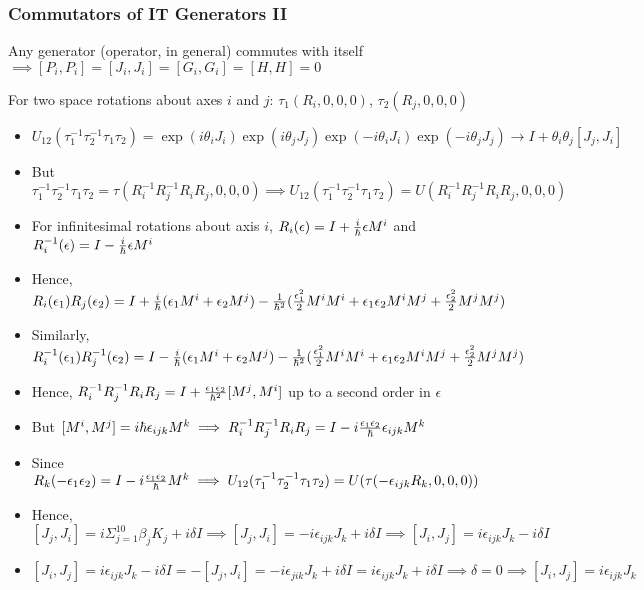 \documentclass[8pt,t,mathserif,aspectratio=169]{beamer}
\begin{document}
\begin{frame}
  \frametitle{Commutators of IT Generators II}
  \vspace{1mm}
  Any generator (operator, in general) commutes with itself $\implies [P_i,P_i] = [J_i,J_i] = [G_i,G_i] = [H,H] = 0$

  For two space rotations about axes $i$ and $j$: $\tau_1(R_i,0,0,0)$, $\tau_2(R_j,0,0,0)$
  \begin{itemize}
    \item $U_{12}(\tau^{-1}_1 \tau^{-1}_2 \tau_1 \tau_2) = \exp(i \theta_i J_i) \exp(i \theta_j J_j) \exp(-i \theta_i J_i) \exp(-i \theta_j J_j) \to I + \theta_i \theta_j [J_j,J_i]$
    \item But $\tau^{-1}_1 \tau^{-1}_2 \tau_1 \tau_2 = \tau(R^{-1}_i R^{-1}_j R_i R_j,0,0,0) \implies U_{12}(\tau^{-1}_1 \tau^{-1}_2 \tau_1 \tau_2) = U(R^{-1}_i R^{-1}_j R_i R_j,0,0,0)$
    \item For infinitesimal rotations about axis $i$, $R_i(\epsilon) = I + {i \over \hbar} \epsilon M^i$ and $R^{-1}_{i}(\epsilon) = I - {i \over \hbar} \epsilon M^i$
    \item Hence, $R_i(\epsilon_1) R_j(\epsilon_2) = I + {i \over \hbar} (\epsilon_1 M^{i} + \epsilon_2 M^{j}) - {1 \over \hbar^2}({\epsilon^2_1 \over 2} M^i M^i + \epsilon_1 \epsilon_2 M^i M^j + {\epsilon^2_2 \over 2} M^j M^j)$
    \item Similarly, $R^{-1}_{i}(\epsilon_1) R^{-1}_{j}(\epsilon_2) = I - {i \over \hbar} (\epsilon_1 M^{i} + \epsilon_2 M^{j}) - {1 \over \hbar^2}({\epsilon^2_1 \over 2} M^i M^i + \epsilon_1 \epsilon_2 M^i M^j + {\epsilon^2_2 \over 2} M^j M^j)$
    \item Hence, $R^{-1}_{i} R^{-1}_{j} R_i R_j = I + {\epsilon_1 \epsilon_2 \over \hbar^2} [M^j,M^i]$ up to a second order in $\epsilon$
    \item But $[M^i,M^j] = i \hbar \epsilon_{ijk} M^k \implies R^{-1}_{i} R^{-1}_{j} R_i R_j = I - i {\epsilon_1 \epsilon_2 \over \hbar} \epsilon_{ijk} M^k$
    \item Since $R_{k}(-\epsilon_1 \epsilon_2) = I - i {\epsilon_1 \epsilon_2 \over \hbar} M^k \implies U_{12}(\tau^{-1}_1 \tau^{-1}_2 \tau_1 \tau_2) = U(\tau(-\epsilon_{ijk} R_k,0,0,0))$
    \item Hence, $[J_j,J_i] = i \Sigma_{j = 1}^{10} \beta_j K_j + i \delta I \implies [J_j,J_i] = -i \epsilon_{ijk} J_k + i \delta I \implies [J_i,J_j] = i \epsilon_{ijk} J_k - i \delta I$
    \item $[J_i,J_j] = i \epsilon_{ijk} J_k - i \delta I = -[J_j,J_i] = -i \epsilon_{jik} J_k + i \delta I = i \epsilon_{ijk} J_k + i \delta I \implies \delta = 0 \implies [J_i,J_j] = i \epsilon_{ijk} J_k$
  \end{itemize}
\end{frame}
\end{document}
